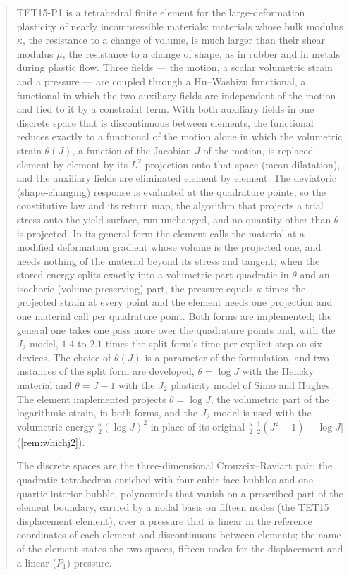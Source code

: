 \documentclass{article}
\theoremstyle{definition}
\theoremstyle{plain}
\begin{document}
\begin{abstract}
TET15-P1 is a tetrahedral finite
element for the large-deformation plasticity of nearly incompressible
materials: materials whose bulk modulus $\kappa$, the resistance to a change
of volume, is much larger than their shear modulus $\mu$, the resistance to a
change of shape, as in rubber and in metals during plastic flow. Three fields
--- the motion, a scalar volumetric strain and a pressure --- are coupled
through a Hu--Washizu functional, a functional in which the two auxiliary
fields are independent of the motion and tied to it by a constraint term.
With both auxiliary fields in one discrete space that is discontinuous
between elements, the functional reduces exactly to a functional of the
motion alone in which the volumetric strain $\theta(J)$, a function of the
Jacobian $J$ of the motion, is replaced element by element by its $L^2$
projection onto that space (mean dilatation), and the auxiliary fields are
eliminated element by element. The deviatoric (shape-changing) response is
evaluated at the quadrature points, so the constitutive law and its return
map, the algorithm that projects a trial stress onto the yield surface, run
unchanged, and no quantity other than $\theta$ is projected. In its general
form the element calls the material at a modified deformation gradient
whose volume is the projected one, and needs nothing of the material beyond
its stress and tangent; when the stored energy splits exactly into a
volumetric part quadratic in $\theta$ and an isochoric (volume-preserving)
part, the pressure equals $\kappa$ times the projected strain at every
point and the element needs one projection and one material call per
quadrature point. Both forms are implemented; the general one takes one
pass more over the quadrature points and, with the $J_2$ model, $1.4$ to
$2.1$ times the split form's time per explicit step on six devices. The
choice of $\theta(J)$
is a parameter of the formulation, and two instances of the split form are
developed, $\theta = \log J$ with the Hencky material and $\theta = J - 1$
with the $J_2$ plasticity model of Simo and Hughes. The element implemented
projects $\theta = \log J$, the volumetric part of the logarithmic strain,
in both forms, and the $J_2$ model is used with the volumetric energy
$\tfrac{\kappa}{2}(\log J)^2$ in place of its original
$\tfrac{\kappa}{2}\big[\tfrac12(J^2-1) - \log J\big]$ (\cref{rem:whichj2}).

The discrete spaces are the
three-dimensional Crouzeix--Raviart pair: the quadratic tetrahedron enriched
with four cubic face bubbles and one quartic interior bubble, polynomials
that vanish on a prescribed part of the element boundary, carried by a nodal
basis on fifteen nodes (the TET15 displacement element), over a pressure that is
linear in the reference coordinates of each element and discontinuous
between elements; the name of the element states the two spaces, fifteen
nodes for the displacement and a linear ($P_1$) pressure.


\end{abstract}
\end{document}
